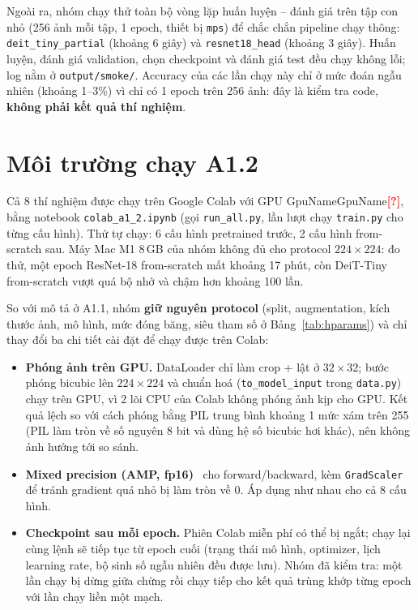 \documentclass[12pt]{article}
\newcommand{\code}[1]{\texttt{#1}}
\newcommand{\st}[1]{\textbf{#1}}
\newcommand{\todo}[1]{\textcolor{red}{\textbf{[#1]}}}
\newcommand{\val}[1]{\ifcsname #1\endcsname\csname #1\endcsname\else\todo{?}\fi}
\begin{document}
Ngoài ra, nhóm chạy thử toàn bộ vòng lặp huấn luyện -- đánh giá trên tập con nhỏ (256 ảnh mỗi tập, 1 epoch, thiết bị
\code{mps}) để chắc chắn pipeline chạy thông: \code{deit\_tiny\_partial} (khoảng 6 giây) và \code{resnet18\_head}
(khoảng 3 giây). Huấn luyện, đánh giá validation, chọn checkpoint và đánh giá test đều chạy không lỗi; log nằm ở
\code{output/smoke/}. Accuracy của các lần chạy này chỉ ở mức đoán ngẫu nhiên (khoảng 1--3\%) vì chỉ có 1 epoch trên
256 ảnh: đây là kiểm tra code, \st{không phải kết quả thí nghiệm}.
\section{Môi trường chạy A1.2}\label{sec:env}
Cả 8 thí nghiệm được chạy trên Google Colab với GPU \val{GpuName}, bằng notebook \code{colab\_a1\_2.ipynb}
(gọi \code{run\_all.py}, lần lượt chạy \code{train.py} cho từng cấu hình). Thứ tự chạy: 6 cấu hình pretrained trước,
2 cấu hình from-scratch sau. Máy Mac M1 8\,GB của nhóm không đủ cho protocol $224\times224$: đo thử, một epoch
ResNet-18 from-scratch mất khoảng 17 phút, còn DeiT-Tiny from-scratch vượt quá bộ nhớ và chậm hơn khoảng 100 lần.

So với mô tả ở A1.1, nhóm \st{giữ nguyên protocol} (split, augmentation, kích thước ảnh, mô hình, mức đóng băng,
siêu tham số ở Bảng~\ref{tab:hparams}) và chỉ thay đổi ba chi tiết cài đặt để chạy được trên Colab:
\begin{itemize}
  \item \st{Phóng ảnh trên GPU.} DataLoader chỉ làm crop + lật ở $32\times32$; bước phóng bicubic lên $224\times224$ và
        chuẩn hoá (\code{to\_model\_input} trong \code{data.py}) chạy trên GPU, vì 2 lõi CPU của Colab không phóng ảnh kịp
        cho GPU. Kết quả lệch so với cách phóng bằng PIL trung bình khoảng 1 mức xám trên 255 (PIL làm tròn về số nguyên
        8 bit và dùng hệ số bicubic hơi khác), nên không ảnh hưởng tới so sánh.
  \item \st{Mixed precision (AMP, fp16)}~\cite{micikevicius2018} cho forward/backward, kèm \code{GradScaler} để tránh
        gradient quá nhỏ bị làm tròn về 0. Áp dụng như nhau cho cả 8 cấu hình.
  \item \st{Checkpoint sau mỗi epoch.} Phiên Colab miễn phí có thể bị ngắt; chạy lại cùng lệnh sẽ tiếp tục từ epoch cuối
        (trạng thái mô hình, optimizer, lịch learning rate, bộ sinh số ngẫu nhiên đều được lưu). Nhóm đã kiểm tra: một lần
        chạy bị dừng giữa chừng rồi chạy tiếp cho kết quả trùng khớp từng epoch với lần chạy liền một mạch.
\end{itemize}
\end{document}
